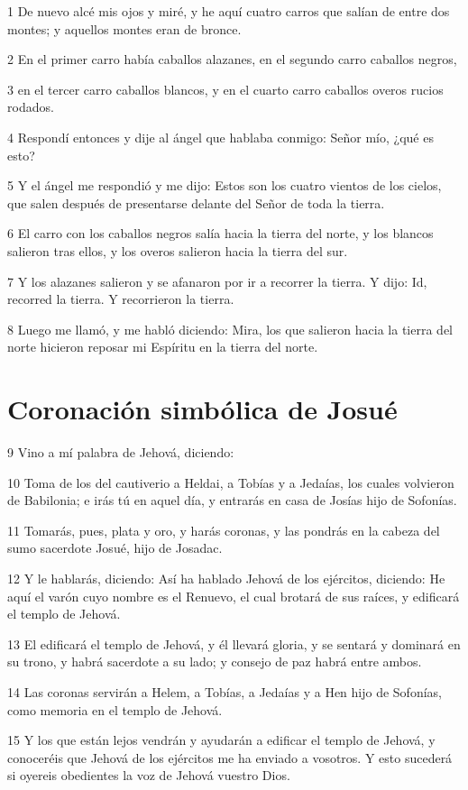 \par 1 De nuevo alcé mis ojos y miré, y he aquí cuatro carros que salían de entre dos montes; y aquellos montes eran de bronce.
\par 2 En el primer carro había caballos alazanes, en el segundo carro caballos negros, 
\par 3 en el tercer carro caballos blancos, y en el cuarto carro caballos overos rucios rodados.
\par 4 Respondí entonces y dije al ángel que hablaba conmigo: Señor mío, ¿qué es esto?
\par 5 Y el ángel me respondió y me dijo: Estos son los cuatro vientos de los cielos, que salen después de presentarse delante del Señor de toda la tierra.
\par 6 El carro con los caballos negros salía hacia la tierra del norte, y los blancos salieron tras ellos, y los overos salieron hacia la tierra del sur.
\par 7 Y los alazanes salieron y se afanaron por ir a recorrer la tierra. Y dijo: Id, recorred la tierra. Y recorrieron la tierra.
\par 8 Luego me llamó, y me habló diciendo: Mira, los que salieron hacia la tierra del norte hicieron reposar mi Espíritu en la tierra del norte.

\section*{Coronación simbólica de Josué}

\par 9 Vino a mí palabra de Jehová, diciendo:
\par 10 Toma de los del cautiverio a Heldai, a Tobías y a Jedaías, los cuales volvieron de Babilonia; e irás tú en aquel día, y entrarás en casa de Josías hijo de Sofonías.
\par 11 Tomarás, pues, plata y oro, y harás coronas, y las pondrás en la cabeza del sumo sacerdote Josué, hijo de Josadac.
\par 12 Y le hablarás, diciendo: Así ha hablado Jehová de los ejércitos, diciendo: He aquí el varón cuyo nombre es el Renuevo, el cual brotará de sus raíces, y edificará el templo de Jehová.
\par 13 El edificará el templo de Jehová, y él llevará gloria, y se sentará y dominará en su trono, y habrá sacerdote a su lado; y consejo de paz habrá entre ambos.
\par 14 Las coronas servirán a Helem, a Tobías, a Jedaías y a Hen hijo de Sofonías, como memoria en el templo de Jehová.
\par 15 Y los que están lejos vendrán y ayudarán a edificar el templo de Jehová, y conoceréis que Jehová de los ejércitos me ha enviado a vosotros. Y esto sucederá si oyereis obedientes la voz de Jehová vuestro Dios.


